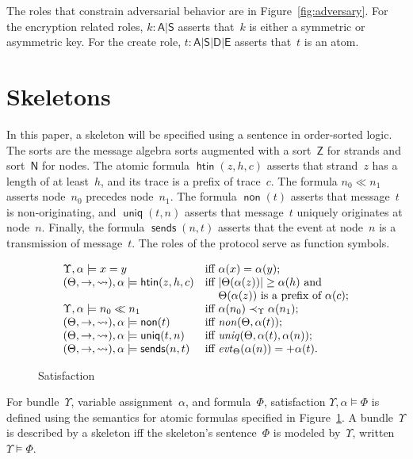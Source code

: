 \documentclass[12pt]{article}
\newcommand{\cn}[1]{\ensuremath{\operatorname{\mathsf{#1}}}}
\newcommand{\fn}[1]{\ensuremath{\operatorname{\mathit{#1}}}}
\newcommand{\srt}[1]{\ensuremath{\mathsf{#1}}}
\newcommand{\typ}{\mathbin:}
\newcommand{\outbnd}{\mathord +}
\newcommand{\key}{\srt{A}|\srt{S}}
\newcommand{\base}{\key|\srt{D}|\srt{E}}
\newcommand{\evt}{\fn{evt}}
\begin{document}
The roles that constrain adversarial behavior are in
Figure~\ref{fig:adversary}.  For the encryption related roles,
$k\typ\key$ asserts that~$k$ is either a symmetric or asymmetric
key.  For the create role, $t\typ\base$ asserts that~$t$ is an atom.

\section{Skeletons}\label{sec:skeletons}

In this paper, a skeleton will be specified using a sentence in
order-sorted logic.  The sorts are the message algebra sorts augmented
with a sort~\srt{Z} for strands and sort~\srt{N} for nodes.  The
atomic formula $\cn{htin}(z,h,c)$ asserts that strand~$z$ has a length
of at least~$h$, and its trace is a prefix of trace~$c$. The formula
$n_0\ll n_1$ asserts node~$n_0$ precedes node~$n_1$.  The formula
$\cn{non}(t)$ asserts that message~$t$ is non-originating, and
$\cn{uniq}(t,n)$ asserts that message~$t$ uniquely originates at
node~$n$.  Finally, the formula $\cn{sends}(n,t)$ asserts that the
event at node~$n$ is a transmission of message~$t$.  The roles of the
protocol serve as function symbols.

\begin{figure}
$$\begin{array}{l@{\quad}l}
\Upsilon,\alpha\models x=y&\mbox{iff $\alpha(x)=\alpha(y)$;}\\
(\Theta,\to,\leadsto),\alpha\models\cn{htin}(z,h,c)
&\mbox{iff $|\Theta(\alpha(z))|\geq \alpha(h)$ and}\\
&\mbox{\phantom{iff} $\Theta(\alpha(z))$ is a prefix of $\alpha(c)$;}\\
\Upsilon,\alpha\models n_0\ll n_1
&\mbox{iff $\alpha(n_0)\prec_\Upsilon\alpha(n_1)$;}\\
(\Theta,\to,\leadsto),\alpha\models\cn{non}(t)
&\mbox{iff $\fn{non}(\Theta,\alpha(t))$;}\\
(\Theta,\to,\leadsto),\alpha\models\cn{uniq}(t,n)
&\mbox{iff $\fn{uniq}(\Theta,\alpha(t),\alpha(n))$;}\\
(\Theta,\to,\leadsto),\alpha\models\cn{sends}(n,t)
&\mbox{iff $\evt_\Theta(\alpha(n))=\outbnd\alpha(t)$.}
\end{array}$$
\caption{Satisfaction}\label{fig:satisfaction}
\end{figure}

For bundle~$\Upsilon$, variable assignment~$\alpha$, and
formula~$\Phi$, satisfaction $\Upsilon,\alpha\models\Phi$ is defined
using the semantics for atomic formulas specified in
Figure~\ref{fig:satisfaction}.  A bundle~$\Upsilon$ is described by a
skeleton iff the skeleton's sentence~$\Phi$ is modeled by~$\Upsilon$,
written $\Upsilon\models\Phi$.



\end{document}
